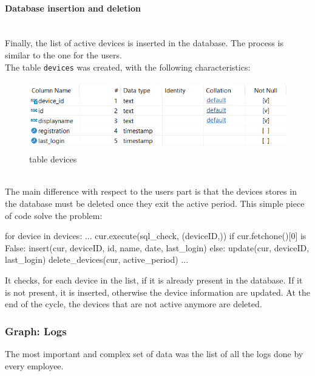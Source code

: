 \documentclass[12pt, a4paper, oneside]{article}
\begin{document}
\paragraph{Database insertion and deletion} ~\\
Finally, the list of active devices is inserted in the database. The process is similar to the one for the users.\\
The table \texttt{devices} was created, with the following characteristics:
\begin{figure}[h]
    \centering
    \includegraphics[width=12cm, height=3cm]{table-devices.png}
    \caption{table devices}
\end{figure}\\
The main difference with respect to the users part is that the devices stores in the database must be deleted once they exit the active period.
\newline\newline
This simple piece of code solve the problem:
\begin{python}
    for device in devices:
        ...
        cur.execute(sql_check, (deviceID,))
        if cur.fetchone()[0] is False:
            insert(cur, deviceID, id, name, date, last_login)
        else:
            update(cur, deviceID, last_login)
    delete_devices(cur, active_period)
    ...
\end{python}
It checks, for each device in the list, if it is already present in the database. If it is not present, it is inserted, otherwise the device information are updated. At the end of the cycle, 
the devices that are not active anymore are deleted.

\subsubsection{Graph: Logs}
The most important and complex set of data was the list of all the logs done by every employee.
\end{document}
